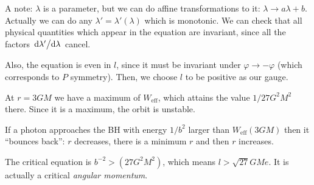 \documentclass[main.tex]{subfiles}
\begin{document}
A note: \(\lambda \) is a parameter, but we can do affine transformations to it: \(\lambda \rightarrow a \lambda + b\). Actually we can do any \(\lambda' = \lambda' (\lambda )\) which is monotonic. 
We can check that all physical quantities which appear in the equation are invariant, since all the factors \(\dv*{\lambda ' }{\lambda }\) cancel. 

Also, the equation is even in \(l\), since it must be invariant under \(\varphi \rightarrow - \varphi \) (which corresponds to \(P\) symmetry).
Then, we choose \(l\) to be positive as our gauge.

At \(r = 3GM\) we have a maximum of \(W _{\text{eff}}\), which attains the value \(1 / 27 G^2M^2\) there.
Since it is a maximum, the orbit is unstable. 

If a photon approaches the BH with energy \(1/ b^2\) larger than \(W _{\text{eff}}(3GM)\) then it ``bounces back'': \(r\) decreases, there is a minimum \(r\) and then \(r\) increases. 

The critical equation is \(b^{-2} > (27 G^2M^2)\), which means \(l > \sqrt{27} GM e\). It is actually a critical \emph{angular momentum}.
\end{document}
